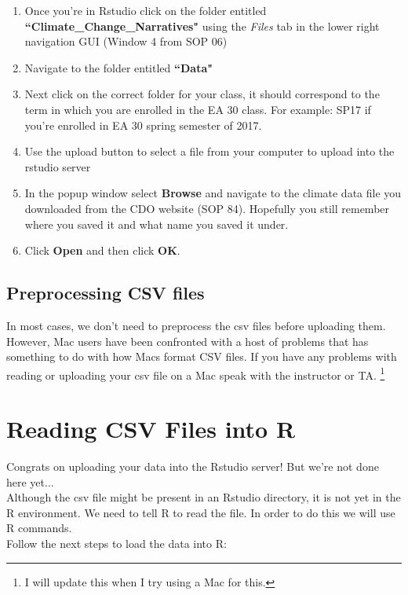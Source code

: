 \documentclass{article}\usepackage[]{graphicx}\usepackage[]{color}
\begin{document}
  \begin{enumerate}
  \item Once you're in Rstudio click on the folder entitled \textbf{``Climate\_Change\_Narratives"} using the \textit{Files} tab in the lower right navigation GUI (Window 4 from SOP 06)
  \item Navigate to the folder entitled \textbf{``Data"} 
  \item Next click on the correct folder for your class, it should correspond to the term in which you are enrolled in the EA 30 class. For example: SP17 if you're enrolled in EA 30 spring semester of 2017.
  \item Use the upload button to select a file from your computer to upload into the rstudio server
  \begin{figure}[h]
  \end{figure}
  \item In the popup window select \textbf{Browse} and navigate to the climate data file you downloaded from the CDO website (SOP 84). Hopefully you still remember where you saved it and what name you saved it under. 
  \item Click \textbf{Open} and then click \textbf{OK}. 
  
  \end{enumerate}


\subsection{Preprocessing CSV files}

In most cases, we don't need to preprocess the csv files before uploading them. However, Mac users have been confronted with a host of problems that has something to do with how Macs format CSV files. If you have any problems with reading or uploading your csv file on a Mac speak with the instructor or TA. \footnote{I will update this when I try using a Mac for this.}


\section{Reading CSV Files into R}

Congrats on uploading your data into the Rstudio server! But we're not done here yet...\\ Although the csv file might be present in an Rstudio directory, it is not yet in the R environment. We need to tell R to read the file. In order to do this we will use R commands. %
\\ Follow the next steps to load the data into R: 
\end{document}
